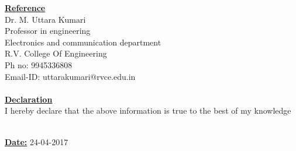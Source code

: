 \documentclass[10pt]{article}
\begin{document}
	\hfill
	
	\underline{\textbf{\Large{Reference}}}\\

	Dr. M. Uttara Kumari \\
	Professor in engineering \\
	Electronics and communication department \\
	R.V. College Of Engineering \\
	Ph no: 9945336808 \\
	Email-ID: uttarakumari@rvce.edu.in \\
	
	\hfill\\
	
	\underline{\textbf{\Large{Declaration}}} \\
	
	I hereby declare that the above information is true to the best of my knowledge
	
	\hfill\\
	
	\underline{\textbf{\large{Date:}}}  24-04-2017
\end{document}
